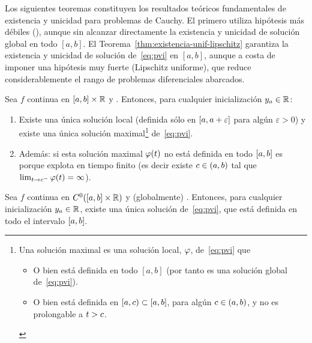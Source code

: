 Los siguientes teoremas constituyen los resultados teóricos
fundamentales de existencia y unicidad para problemas de Cauchy. El
primero utiliza hipótesis más débiles (\locLipschitz), aunque sin
alcanzar directamente la existencia y unicidad de solución global en
todo $[a,b]$. El Teorema~\ref{thm:existencia-unif-lipschitz} garantiza
la existencia y unicidad de solución de~\eqref{eq:pvi} en $[a,b]$,
aunque a costa de imponer una hipótesis muy fuerte (Lipschitz
uniforme), que reduce considerablemente el rango de problemas
diferenciales abarcados.
\begin{theorem}
  \label{thm:existencia-loc-lipschitz}
  Sea $f$ continua en $[\ta,\tb]\times\Rset$ y \locLipschitz. Entonces, para
  cualquier inicialización $\ycero\in\Rset$:
  \begin{enumerate}
  \item Existe una única solución local (definida sólo en
    $[\ta,\ta+\varepsilon]$ para algún $\varepsilon>0$) y existe una
    única solución maximal\footnote{Una solución maximal es una
      solución local, $\sol$, de~\eqref{eq:pvi} que
      \begin{itemize}
      \item O bien está definida en todo $[a,b]$ (por tanto es una
        solución global de~\eqref{eq:pvi}).
      \item O bien está definida en $[\ta,c)\subset[\ta,\tb]$, para
        algún $c\in(\ta,\tb)$, y no es prolongable a $\tt>c$.
      \end{itemize}}
    de~\eqref{eq:pvi}.
  \item Además: si esta solución maximal $\sol(\tt)$ no está definida en todo
    $[\ta,\tb]$ es porque explota en tiempo finito (es decir existe
    $c\in (\ta,\tb)$ tal que $\lim_{\tt\to c^-} \sol(\tt) = \infty$).
  \end{enumerate}
\end{theorem}

\begin{theorem}[Picard]
  \label{thm:existencia-unif-lipschitz}
  Sea $f$ continua en $C^0([\ta,\tb]\times\Rset)$ y (globalmente) \globLipschitz.
  Entonces, para cualquier inicialización $\ycero\in\Rset$, existe una
  única solución de~\eqref{eq:pvi}, que está definida en todo el
  intervalo $[\ta,\tb]$.%
\end{theorem}

